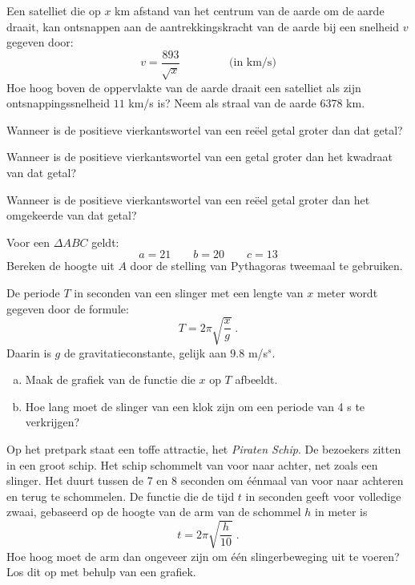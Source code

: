 \documentclass[12pt,twoside]{article}
\begin{document}
\begin{oefening} %
Een satelliet die op $x$ km afstand van het centrum van de aarde om de aarde draait, kan ontsnappen aan de aantrekkingskracht van de aarde bij een snelheid $v$ gegeven door:
$$v=\dfrac{893}{\sqrt{x}}\qquad\qquad\mbox{ (in km/s)}$$
Hoe hoog boven de oppervlakte van de aarde draait een satelliet als zijn ontsnappingssnelheid $11$ km/s is? Neem als straal van de aarde 6378 km.
\end{oefening}

\begin{oefening} %
Wanneer is de positieve vierkantswortel van een reëel getal groter dan dat getal?
\end{oefening}

\begin{oefening} %
Wanneer is de positieve vierkantswortel van een getal groter dan het kwadraat van dat getal?
\end{oefening}

\begin{oefening} %
Wanneer is de positieve vierkantswortel van een reëel getal groter dan het omgekeerde van dat getal?
\end{oefening}


\begin{oefening} %
Voor een $\Delta ABC$ geldt:
$$a=21\qquad b=20\qquad c=13$$
Bereken de hoogte uit $A$ door de stelling van Pythagoras tweemaal te gebruiken.
\end{oefening}

\begin{oefening} %
De periode $T$ in seconden van een slinger met een lengte van $x$ meter wordt gegeven door de formule:
$$T=2\pi\sqrt{\dfrac{x}{g}}\;.$$
Daarin is $g$ de gravitatieconstante, gelijk aan $9.8$ m/s$^s$.
\begin{enumerate}[(a)]
  \item Maak de grafiek van de functie die $x$ op $T$ afbeeldt.
  \item Hoe lang moet de slinger van een klok zijn om een periode van 4 s te verkrijgen?
\end{enumerate}
\end{oefening}

\begin{oefening} %
Op het pretpark staat een toffe attractie, het {\em Piraten Schip}. De bezoekers zitten in een groot schip. Het schip schommelt van voor naar achter, net zoals een slinger. Het duurt tussen de 7 en 8 seconden om éénmaal van voor naar achteren en terug te schommelen. De functie die de tijd $t$ in seconden geeft voor volledige zwaai, gebaseerd op de hoogte van de arm van de schommel $h$ in meter is
$$t=2\pi\sqrt{\dfrac{h}{10}}\;.$$
Hoe hoog moet de arm dan ongeveer zijn om één slingerbeweging uit te voeren? Los dit op met behulp van een grafiek.
\end{oefening}
\end{document}
